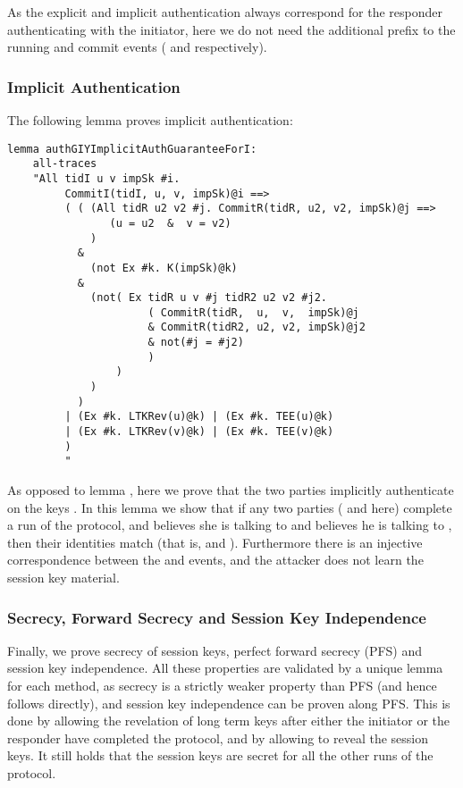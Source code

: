 As the explicit and implicit authentication always correspond for the
responder authenticating with the initiator, here we do not need the
additional  prefix to the running and commit events
( and  respectively).

 
\subsubsection{Implicit Authentication}

The following lemma proves implicit authentication:
\begin{lstlisting}
lemma authGIYImplicitAuthGuaranteeForI:
    all-traces
    "All tidI u v impSk #i.
         CommitI(tidI, u, v, impSk)@i ==>
         ( ( (All tidR u2 v2 #j. CommitR(tidR, u2, v2, impSk)@j ==>
                (u = u2  &  v = v2)
             )
           &
             (not Ex #k. K(impSk)@k)
           &
             (not( Ex tidR u v #j tidR2 u2 v2 #j2.
                      ( CommitR(tidR,  u,  v,  impSk)@j
                      & CommitR(tidR2, u2, v2, impSk)@j2
                      & not(#j = #j2)
                      )
                 )
             )
           )
         | (Ex #k. LTKRev(u)@k) | (Ex #k. TEE(u)@k)
         | (Ex #k. LTKRev(v)@k) | (Ex #k. TEE(v)@k)
         )
         "
\end{lstlisting}

As opposed to lemma , here we prove that the two
parties implicitly authenticate on the keys . %
In this lemma we show that if any two parties ( and  here) complete
a run of the protocol, and  believes she is talking to  and 
believes he is talking to , then their identities match (that is,
 and ). Furthermore there is an injective correspondence
between the  and  events, and the attacker does not
learn the session key material.

 
\subsubsection{Secrecy, Forward Secrecy and Session Key Independence}

Finally, we prove secrecy of session keys, perfect forward secrecy
(PFS) and session key independence.
%
All these properties are validated by a unique lemma for each method,
as secrecy is a strictly weaker property than PFS (and hence follows
directly), and session key independence can be proven along PFS.
%
This is done by allowing the revelation of long term keys after either
the initiator or the responder have completed the protocol, and by
allowing to reveal the session keys.
%
It still holds that the session keys are secret for all the other runs
of the protocol.

